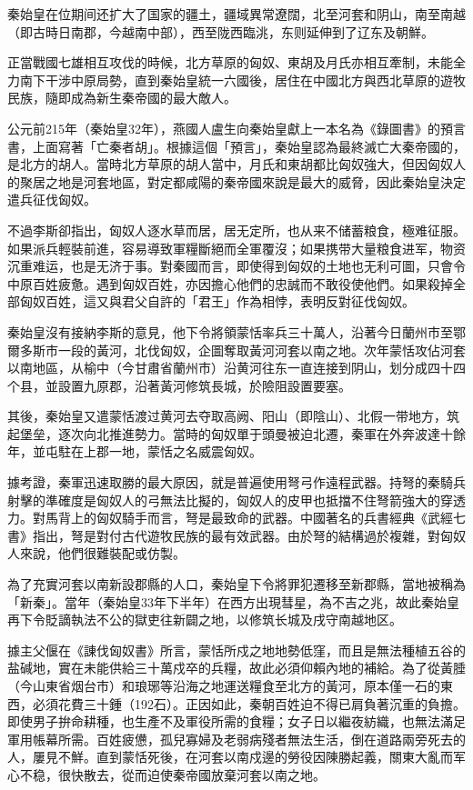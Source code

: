 秦始皇在位期间还扩大了国家的疆土，疆域異常遼闊，北至河套和阴山，南至南越（即古時日南郡，今越南中部），西至陇西臨洮，东则延伸到了辽东及朝鮮。

正當戰國七雄相互攻伐的時候，北方草原的匈奴、東胡及月氏亦相互牽制，未能全力南下干涉中原局勢，直到秦始皇統一六國後，居住在中國北方與西北草原的遊牧民族，隨即成為新生秦帝國的最大敵人。

公元前215年（秦始皇32年），燕國人盧生向秦始皇獻上一本名為《錄圖書》的預言書，上面寫著「亡秦者胡」。根據這個「預言」，秦始皇認為最終滅亡大秦帝國的，是北方的胡人。當時北方草原的胡人當中，月氏和東胡都比匈奴強大，但因匈奴人的聚居之地是河套地區，對定都咸陽的秦帝國來說是最大的威脅，因此秦始皇決定遣兵征伐匈奴。

不過李斯卻指出，匈奴人逐水草而居，居无定所，也从来不储蓄粮食，極难征服。如果派兵輕裝前進，容易導致軍糧斷絕而全軍覆沒；如果携带大量粮食进军，物资沉重难运，也是无济于事。對秦國而言，即使得到匈奴的土地也无利可圖，只會令中原百姓疲惫。遇到匈奴百姓，亦因擔心他們的忠誠而不敢役使他們。如果殺掉全部匈奴百姓，這又與君父自許的「君王」作為相悖，表明反對征伐匈奴。

秦始皇沒有接納李斯的意見，他下令將領蒙恬率兵三十萬人，沿著今日蘭州市至鄂爾多斯市一段的黃河，北伐匈奴，企圖奪取黃河河套以南之地。次年蒙恬攻佔河套以南地區，从榆中（今甘肅省蘭州市）沿黄河往东一直连接到阴山，划分成四十四个县，並設置九原郡，沿著黃河修筑長城，於險阻設置要塞。

其後，秦始皇又遣蒙恬渡过黄河去夺取高阙、阳山（即陰山）、北假一带地方，筑起堡垒，逐次向北推進勢力。當時的匈奴單于頭曼被迫北遷，秦軍在外奔波達十餘年，並屯駐在上郡一地，蒙恬之名威震匈奴。

據考證，秦軍迅速取勝的最大原因，就是普遍使用弩弓作遠程武器。持弩的秦騎兵射擊的準確度是匈奴人的弓無法比擬的，匈奴人的皮甲也抵擋不住弩箭強大的穿透力。對馬背上的匈奴騎手而言，弩是最致命的武器。中國著名的兵書經典《武經七書》指出，弩是對付古代遊牧民族的最有效武器。由於弩的結構過於複雜，對匈奴人來說，他們很難裝配或仿製。

為了充實河套以南新設郡縣的人口，秦始皇下令將罪犯遷移至新郡縣，當地被稱為「新秦」。當年（秦始皇33年下半年）在西方出現彗星，為不吉之兆，故此秦始皇再下令貶謫執法不公的獄吏往新闢之地，以修筑长城及戌守南越地区。

據主父偃在《諌伐匈奴書》所言，蒙恬所戍之地地勢低窪，而且是無法種植五谷的盐碱地，實在未能供給三十萬戍卒的兵糧，故此必須仰賴內地的補給。為了從黃腄（今山東省烟台市）和琅琊等沿海之地運送糧食至北方的黃河，原本僅一石的東西，必須花費三十鍾（192石）。正因如此，秦朝百姓迫不得已肩負著沉重的負擔。即使男子拚命耕種，也生產不及軍役所需的食糧；女子日以繼夜紡織，也無法滿足軍用帳幕所需。百姓疲憊，孤兒寡婦及老弱病殘者無法生活，倒在道路兩旁死去的人，屢見不鮮。直到蒙恬死後，在河套以南戍邊的勞役因陳勝起義，關東大亂而军心不稳，很快散去，從而迫使秦帝國放棄河套以南之地。

